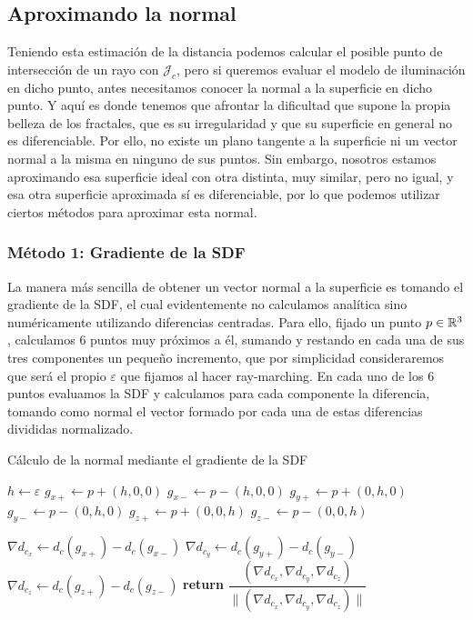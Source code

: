 \subsection{Aproximando la normal}
\label{subsection:normal-sdf}

Teniendo esta estimación de la distancia podemos calcular el posible punto de intersección de un rayo con $\mathcal{J}_c$, pero si queremos evaluar el modelo de iluminación en dicho punto, antes necesitamos conocer la normal a la superficie en dicho punto. Y aquí es donde tenemos que afrontar la dificultad que supone la propia belleza de los fractales, que es su irregularidad y que su superficie en general no es diferenciable. Por ello, no existe un plano tangente a la superficie ni un vector normal a la misma en ninguno de sus puntos. Sin embargo, nosotros estamos aproximando esa superficie ideal con otra distinta, muy similar, pero no igual, y esa otra superficie aproximada sí es diferenciable, por lo que podemos utilizar ciertos métodos para aproximar esta normal.

\subsubsection{Método 1: Gradiente de la SDF}

La manera más sencilla de obtener un vector normal a la superficie es tomando el gradiente de la SDF, el cual evidentemente no calculamos analítica sino numéricamente utilizando diferencias centradas. Para ello, fijado un punto $p\in\mathbb{R}^3$, calculamos 6 puntos muy próximos a él, sumando y restando en cada una de sus tres componentes un pequeño incremento, que por simplicidad consideraremos que será el propio $\varepsilon$ que fijamos al hacer ray-marching. En cada uno de los 6 puntos evaluamos la SDF y calculamos para cada componente la diferencia, tomando como normal el vector formado por cada una de estas diferencias divididas normalizado.

\begin{algorithm}[H]
    \caption{Cálculo de la normal mediante el gradiente de la SDF} \label{alg:normal-gradiente-sdf}
    \begin{algorithmic}
        \State $h\gets\varepsilon$
        \State $g_{x+}\gets p + (h,0,0)$
        \State $g_{x-}\gets p - (h,0,0)$
        \State $g_{y+}\gets p + (0,h,0)$
        \State $g_{y-}\gets p - (0,h,0)$
        \State $g_{z+}\gets p + (0,0,h)$
        \State $g_{z-}\gets p - (0,0,h)$

        \State $\nabla d_{c_x} \gets d_c(g_{x+})-d_c(g_{x-})$
        \State $\nabla d_{c_y} \gets d_c(g_{y+})-d_c(g_{y-})$
        \State $\nabla d_{c_z} \gets d_c(g_{z+})-d_c(g_{z-})$
            \State \textbf{return} $\dfrac{(\nabla d_{c_x},\nabla d_{c_y},\nabla d_{c_z})}{\|(\nabla d_{c_x},\nabla d_{c_y},\nabla d_{c_z})\|}$
    \EndProcedure
    \end{algorithmic}
\end{algorithm}

